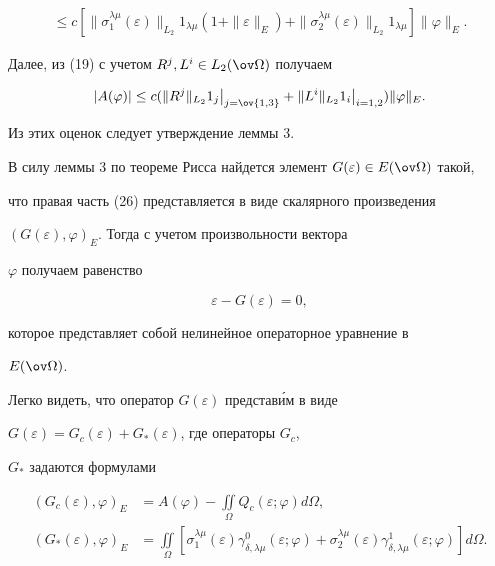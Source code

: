 \begin{pf}
\begin{multline*}
% 


\le c[\|\sigma^{\lambda\mu}_1(\varepsilon)\|_{L_2} 


1_{\lambda\mu}(1+\|\varepsilon\|_E)+ 


\|\sigma^{\lambda\mu}_2(\varepsilon)\|_{L_2} 


1_{\lambda\mu}]\|\varphi\|_E. 


\end{multline*} 


 


Далее, из (19) с учетом $R^j,L^i\in L_2(\ov\Omega)$ получаем 


$$ 


|A(\varphi)|\le c(\|R^j\|_{L_2}1_j\big|_{j=\ov{1,3}} 


+\|L^i\|_{L_2}1_i\big|_{i=1,2})\|\varphi\|_E. 


$$ 


Из этих оценок следует утверждение леммы 3. 


\end{pf} 


 


 


В силу леммы 3 по теореме Рисса найдется элемент $G(\varepsilon)\in 


E(\ov\Omega)$ такой, 


что правая часть (26) представляется в виде скалярного произведения 


$(G(\varepsilon),\varphi)_E$. Тогда с учетом произвольности вектора 


$\varphi$ получаем равенство 


\begin{equation} 


\varepsilon-G(\varepsilon)=0, 


\end{equation} 


которое представляет собой нелинейное операторное уравнение в 


$E(\ov\Omega)$. 


Легко видеть, что оператор $G(\varepsilon)$ представ\'им в виде 


$G(\varepsilon)=G_c(\varepsilon)+G_*(\varepsilon)$, где операторы $G_c$, 


$G_*$ задаются формулами 


\begin{align} 


(G_c(\varepsilon),\varphi)_E&=A(\varphi)-\iint\limits_\Omega 


Q_c(\varepsilon;\varphi)d\Omega, \\ 


% 


(G_*(\varepsilon),\varphi)_E&=\iint\limits_\Omega 


[\sigma^{\lambda\mu}_1(\varepsilon)\gamma^0_{\delta,\lambda\mu} 


(\varepsilon;\varphi)+\sigma^{\lambda\mu}_2(\varepsilon) 


\gamma^1_{\delta,\lambda\mu}(\varepsilon;\varphi)]d\Omega. 


\end{align} 



